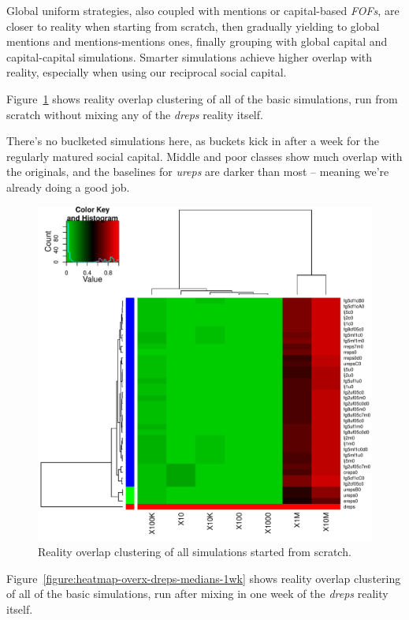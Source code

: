 \documentclass[10pt,oneside]{memoir}
\begin{document}
Global uniform strategies, also coupled with mentions or capital-based {\itshape FOFs}, are closer to reality when starting from scratch, then gradually yielding to global mentions and mentions-mentions ones, finally grouping with global capital and capital-capital simulations.  Smarter simulations achieve higher overlap with reality, especially when using our reciprocal social capital.


Figure~\ref{figure:heatmap-overx-dreps-medians-0wk} shows reality overlap clustering of all of the basic simulations, run from scratch without mixing any of the {\itshape dreps} reality itself.


There's no buclketed simulations here, as buckets kick in after a week for the regularly matured social capital.  Middle and poor classes show much overlap with the originals, and the baselines for {\itshape ureps} are darker than most -- meaning we're already doing a good job.



\begin{figure}
\begin{center}
    \includegraphics{figures/heatmap-overx-dreps-medians-0wk}
    \caption{Reality overlap clustering of all simulations started from scratch.}
    \label{figure:heatmap-overx-dreps-medians-0wk}
\end{center}
\end{figure}
Figure~\ref{figure:heatmap-overx-dreps-medians-1wk} shows reality overlap clustering of all of the basic simulations, run after mixing in one week of the {\itshape dreps} reality itself.
\end{document}
